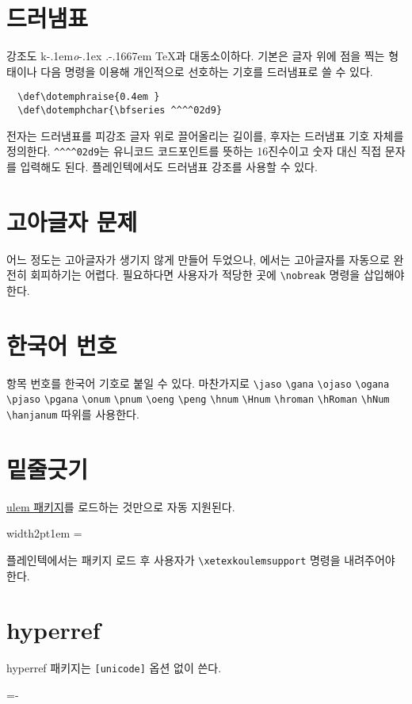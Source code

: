 \documentclass[a4paper]{article}
\def\dotemphraise{0.2em}
\def\logoko{\textsf{k}\kern-.1em\textit{o}}
\def\kotex{\logoko\kern-.1ex .\kern-.1667em \TeX}
\newenvironment{plaintex}
  {\par\medskip\leavevmode\hbox\bgroup
    \color{white!80!black}\vrule width2pt\color{black}\kern1em
    \vbox\bgroup\hsize=\dimexpr\textwidth-12pt\relax
    \small
  }{\egroup\egroup\par\medskip}
\begin{document}
\section{드러냄표}
 강조도 \kotex 과 대동소이하다.
기본은 글자 위에 점을 찍는 형태이나 다음 명령을 이용해 개인적으로 선호하는
기호를 드러냄표로 쓸 수 있다.
\begin{verbatim}
  \def\dotemphraise{0.4em }
  \def\dotemphchar{\bfseries ^^^^02d9}
\end{verbatim}
전자는 드러냄표를 피강조 글자 위로 끌어올리는 길이를,
후자는 드러냄표 기호 자체를 정의한다.
\verb|^^^^02d9|는 유니코드 코드포인트를 뜻하는 16진수이고
숫자 대신 직접 문자를 입력해도 된다.
플레인텍에서도 드러냄표 강조를 사용할 수 있다.

\section{고아글자 문제}
어느 정도는 고아글자가 생기지 않게 만들어 두었으나,
\XeTeX 에서는 고아글자를 자동으로 완전히 회피하기는 어렵다.
필요하다면 사용자가 적당한 곳에 \verb|\nobreak| 명령을 삽입해야 한다.

\section{한국어 번호}
항목 번호를 한국어 기호로 붙일 수 있다.  마찬가지로
\verb|\jaso| \verb|\gana| \verb|\ojaso| \verb|\ogana| \verb|\pjaso|
\verb|\pgana| \verb|\onum| \verb|\pnum| \verb|\oeng| \verb|\peng|
\verb|\hnum| \verb|\Hnum| \verb|\hroman| \verb|\hRoman| \verb|\hNum|
\verb|\hanjanum|
따위를 사용한다.

\section{밑줄긋기}
 \uline{ulem 패키지}를 로드하는 것만으로 자동 지원된다.
\begin{plaintex}
플레인텍에서는 패키지 로드 후 사용자가 \verb|\xetexkoulemsupport|
명령을 내려주어야 한다.
\end{plaintex}

\section{hyperref}
hyperref 패키지는 \verb+[unicode]+ 옵션 없이 쓴다.

\begin{flushright}
  \fboxsep=-\fboxrule
\end{flushright}
\end{document}
